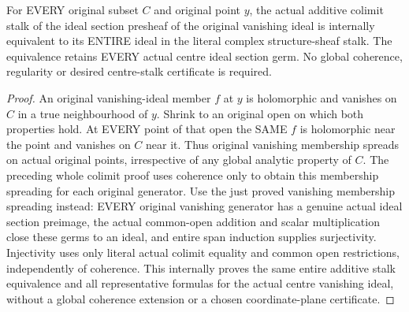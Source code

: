 \begin{theorem}
\label{hir:real-domain-actual-centre-ideal-section-whole-stalk-equivalence}
\leanok
For EVERY original subset $C$ and original point $y$, the actual additive
colimit stalk of the ideal section presheaf of the original vanishing ideal
is internally equivalent to its ENTIRE ideal in the literal complex
structure-sheaf stalk. The equivalence retains EVERY actual centre ideal
section germ. No global coherence, regularity or desired centre-stalk
certificate is required.
\end{theorem}
\begin{proof}
An original vanishing-ideal member $f$ at $y$ is holomorphic and vanishes
on $C$ in a true neighbourhood of $y$. Shrink to an original open on
which both properties hold. At EVERY point of that open the SAME $f$
is holomorphic near the point and vanishes on $C$ near it. Thus original
vanishing membership spreads on actual original points, irrespective of
any global analytic property of $C$. The preceding whole colimit proof
uses coherence only to obtain this membership spreading for each original
generator. Use the just proved vanishing membership spreading instead:
EVERY original vanishing generator has a genuine actual ideal section
preimage, the actual common-open addition and scalar multiplication close
these germs to an ideal, and entire span induction supplies surjectivity.
Injectivity uses only literal actual colimit equality and common open
restrictions, independently of coherence. This internally proves the
same entire additive stalk equivalence and all representative formulas
for the actual centre vanishing ideal, without a global coherence
extension or a chosen coordinate-plane certificate.
\end{proof}
